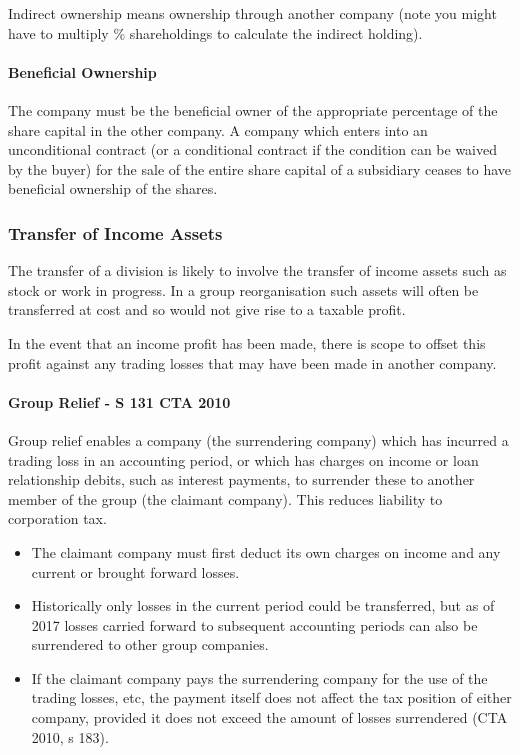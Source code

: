 \documentclass[
]{article}
\providecommand{\tightlist}{%
  \setlength{\itemsep}{0pt}\setlength{\parskip}{0pt}}
\begin{document}
Indirect ownership means ownership through another company (note you
might have to multiply \% shareholdings to calculate the indirect
holding).

\hypertarget{beneficial-ownership}{%
\paragraph{Beneficial Ownership}\label{beneficial-ownership}}

The company must be the beneficial owner of the appropriate percentage
of the share capital in the other company. A company which enters into
an unconditional contract (or a conditional contract if the condition
can be waived by the buyer) for the sale of the entire share capital of
a subsidiary ceases to have beneficial ownership of the shares.

\hypertarget{transfer-of-income-assets}{%
\subsubsection{Transfer of Income
Assets}\label{transfer-of-income-assets}}

The transfer of a division is likely to involve the transfer of income
assets such as stock or work in progress. In a group reorganisation such
assets will often be transferred at cost and so would not give rise to a
taxable profit.

In the event that an income profit has been made, there is scope to
offset this profit against any trading losses that may have been made in
another company.

\hypertarget{group-relief---s-131-cta-2010}{%
\paragraph{Group Relief - S 131 CTA
2010}\label{group-relief---s-131-cta-2010}}

Group relief enables a company (the surrendering company) which has
incurred a trading loss in an accounting period, or which has charges on
income or loan relationship debits, such as interest payments, to
surrender these to another member of the group (the claimant company).
This reduces liability to corporation tax.

\begin{itemize}
\tightlist
\item
  The claimant company must first deduct its own charges on income and
  any current or brought forward losses.
\item
  Historically only losses in the current period could be transferred,
  but as of 2017 losses carried forward to subsequent accounting periods
  can also be surrendered to other group companies.
\item
  If the claimant company pays the surrendering company for the use of
  the trading losses, etc, the payment itself does not affect the tax
  position of either company, provided it does not exceed the amount of
  losses surrendered (CTA 2010, s 183).
\end{itemize}
\end{document}
